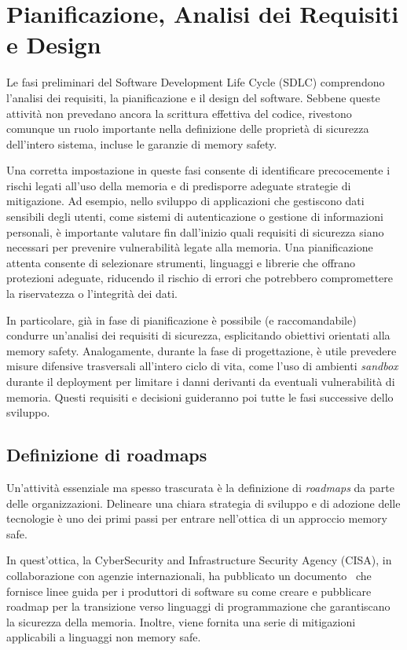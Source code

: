 \section{Pianificazione, Analisi dei Requisiti e Design}
\label{sec:planning_requirements_design}

Le fasi preliminari del Software Development Life Cycle (SDLC) comprendono l'analisi
dei requisiti, la pianificazione e il design del software. Sebbene queste attività
non prevedano ancora la scrittura effettiva del codice, rivestono comunque un
ruolo importante nella definizione delle proprietà di sicurezza dell'intero
sistema, incluse le garanzie di memory safety.

Una corretta impostazione in queste fasi consente di identificare precocemente i
rischi legati all'uso della memoria e di predisporre adeguate strategie di mitigazione.
Ad esempio, nello sviluppo di applicazioni che gestiscono dati sensibili degli utenti,
come sistemi di autenticazione o gestione di informazioni personali, è importante
valutare fin dall'inizio quali requisiti di sicurezza siano necessari per prevenire
vulnerabilità legate alla memoria. Una pianificazione attenta consente di
selezionare strumenti, linguaggi e librerie che offrano protezioni adeguate,
riducendo il rischio di errori che potrebbero compromettere la riservatezza o l'integrità
dei dati.

In particolare, già in fase di pianificazione è possibile (e raccomandabile) condurre
un'analisi dei requisiti di sicurezza, esplicitando obiettivi orientati alla
memory safety. Analogamente, durante la fase di progettazione, è utile prevedere
misure difensive trasversali all'intero ciclo di vita, come l'uso di ambienti
\textit{sandbox} durante il deployment per limitare i danni derivanti da eventuali
vulnerabilità di memoria. Questi requisiti e decisioni guideranno poi tutte le
fasi successive dello sviluppo.

\subsection{Definizione di roadmaps}
\label{sec:roadmap} Un'attività essenziale ma spesso trascurata è la definizione
di \textit{roadmaps} da parte delle organizzazioni. Delineare una chiara
strategia di sviluppo e di adozione delle tecnologie è uno dei primi passi per
entrare nell'ottica di un approccio memory safe.

In quest'ottica, la CyberSecurity and Infrastructure Security Agency (CISA), in
collaborazione con agenzie internazionali, ha pubblicato un documento~\cite{memory_safe_roadmaps}
che fornisce linee guida per i produttori di software su come creare e pubblicare
roadmap per la transizione verso linguaggi di programmazione che garantiscano la
sicurezza della memoria. Inoltre, viene fornita una serie di mitigazioni applicabili
a linguaggi non memory safe.

